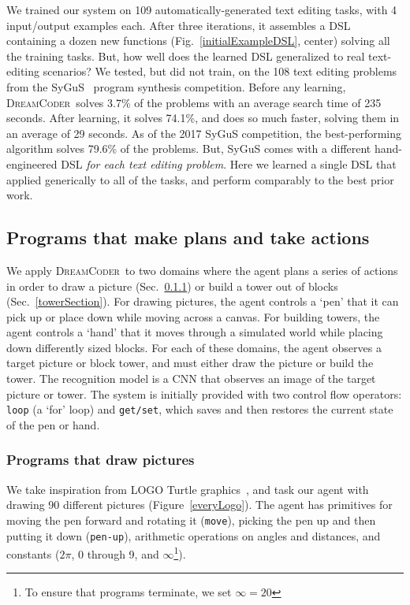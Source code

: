\documentclass{article}
\newcommand{\system}{\textsc{DreamCoder}~}
\newcommand{\code}[1]{{\footnotesize\texttt{#1}}}
\begin{document}
We trained our system on 109 automatically-generated text editing tasks, with 4 input/output examples each.
After three iterations, it assembles a DSL containing a dozen new functions (Fig.~\ref{initialExampleDSL}, center) solving
all the training tasks.
But, how well does the  learned DSL generalized to real text-editing scenarios?
We tested, but did not train, on the 108 text editing problems from the SyGuS~\cite{alur2016sygus} program synthesis competition. Before any learning,
\system solves 3.7\% of the problems with an average search time of 235 seconds.
After learning,
it solves 74.1\%, and does so much faster,
solving them in an average of 29 seconds.
As of the 2017 SyGuS competition,
the best-performing algorithm solves 79.6\% of the problems.
But, SyGuS comes with a
different hand-engineered DSL \emph{for each text editing problem}. %
Here  we learned a single DSL
that applied generically to
all of the tasks,
and perform comparably to the best
prior work.

\subsection{Programs that make plans and take actions}

We apply \system to two domains where the agent plans a series of actions
in order to draw a picture (Sec.~\ref{logoSection}) or build a tower out of blocks (Sec.~\ref{towerSection}).
For drawing pictures,
the agent controls a `pen' that it can pick up or place down while moving across a canvas.
For building towers,
the agent controls a `hand' that it moves through a simulated world while
placing down differently sized blocks.
For each of these domains,
the agent observes a target picture or block tower,
and must either draw the picture or build the tower.
The recognition model is a CNN that
observes an image of the target picture or tower.
The system is initially provided with two control flow operators:
\code{loop} (a `for' loop) and \code{get/set},
which saves and then restores the current state of the pen or hand.

\subsubsection{Programs that draw pictures}\label{logoSection}

We take inspiration from LOGO Turtle graphics~\cite{turtle},
and task our agent with drawing 90 different pictures (Figure~\ref{everyLogo}).
The agent has primitives for moving the pen forward and rotating it (\code{move}),
picking the pen up and then putting it down (\code{pen-up}),
arithmetic operations on angles and distances,
and constants ($2\pi$, 0 through 9, and $\infty$\footnote{To ensure that programs terminate, we set $\infty = 20$}).
\end{document}
